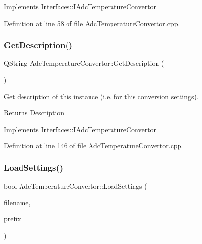 Implements \hyperlink{class_interfaces_1_1_i_adc_temperature_convertor_a61cff0aa0590906acfb18c9b789dceb2}{Interfaces\+::\+I\+Adc\+Temperature\+Convertor}.



Definition at line 58 of file Adc\+Temperature\+Convertor.\+cpp.

\mbox{\label{class_adc_temperature_convertor_ad82afdddbac46a95b6da44e769180d10}} 
\subsubsection{\texorpdfstring{Get\+Description()}{GetDescription()}}
{\footnotesize\ttfamily Q\+String Adc\+Temperature\+Convertor\+::\+Get\+Description (\begin{DoxyParamCaption}{ }\end{DoxyParamCaption})\hspace{0.3cm}{\ttfamily [virtual]}}



Get description of this instance (i.\+e. for this conversion settings). 

\begin{DoxyReturn}{Returns}
Description 
\end{DoxyReturn}


Implements \hyperlink{class_interfaces_1_1_i_adc_temperature_convertor_a2f3b59be793c3ed43e880ef12e9749bc}{Interfaces\+::\+I\+Adc\+Temperature\+Convertor}.



Definition at line 146 of file Adc\+Temperature\+Convertor.\+cpp.

\mbox{\label{class_adc_temperature_convertor_ac45f10e678aa2f9e25c5351dfd283de0}} 
\subsubsection{\texorpdfstring{Load\+Settings()}{LoadSettings()}}
{\footnotesize\ttfamily bool Adc\+Temperature\+Convertor\+::\+Load\+Settings (\begin{DoxyParamCaption}\item[{Q\+String}]{filename,  }\item[{Q\+String}]{prefix }\end{DoxyParamCaption})\hspace{0.3cm}{\ttfamily [virtual]}}




